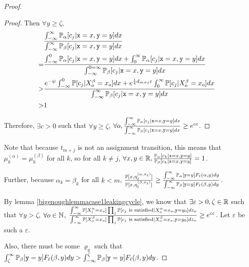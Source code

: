 \begin{proof}
\begin{proof}
	Then $\forall y\geq \zeta$, \begin{align*}
		&\frac{\int_{-\infty}^\infty\mathbb{P}_\alpha[c_j|\texttt{x}=x, \texttt{y}=y]dx}{\int_{-\infty}^\infty \mathbb{P}_\beta[c_j|\texttt{x}=x, \texttt{y}=y]dx} \\
		=&\frac{\int_{-\infty}^{0}\mathbb{P}_\alpha[c_j|\texttt{x}=x, \texttt{y}=y]dx+\int_{0}^{\infty}\mathbb{P}_\alpha[c_j|\texttt{x}=x, \texttt{y}=y]dx}{\int_{-\infty}^{0=\infty}\mathbb{P}_\beta[c_j|\texttt{x}=x, \texttt{y}=y]dx}\\
		>& \frac{e^{-\psi}\int_{-\infty}^{0}\mathbb{P}[c_j|X_o^\beta = x_o]dx+e^{\frac{1}{4}d_{m+j}\varepsilon}\int_{0}^{\infty}\mathbb{P}[c_j|X_o^\beta = x_o]dx}{\int_{-\infty}^{\infty}\mathbb{P}_\beta[c_j|\texttt{x}=x, \texttt{y}=y]dx}\\
		>&1
	\end{align*}

	Therefore, $\exists c>0$ such that $\forall y\geq \zeta$, $\forall o, \frac{\int_{-\infty}^\infty\mathbb{P}_\alpha[c_j|\texttt{x} = x, \texttt{y}=y]dx}{\int_{-\infty}^\infty\mathbb{P}_\beta[c_j|\texttt{x} = x, \texttt{y}=y]dx}\geq e^{c\varepsilon}$.
\end{proof}

	Note that because $t_{m+j}$ is not an assignment transition, this means that $\mu_k^{(\alpha)} = \mu_k^{(\beta)}$ for all $k$, so for all $k\neq j$, $\forall x, y\in \mathbb{R}, \frac{\mathbb{P}_\alpha[c_k|\texttt{x} = x, \texttt{y}=y]}{\mathbb{P}_\beta[c_k|\texttt{x} = x, \texttt{y}=y]}=1$.

	Further, because $\alpha_k = \beta_k$ for all $k<m$, $\frac{\mathbb{P}[x, \eta_\ell^{(\alpha, \sigma_\ell)}]}{\mathbb{P}[x, \eta_\ell^{(\beta, \sigma_\ell)}]}\geq \frac{\int_{-\infty}^\infty\mathbb{P}_\alpha[\texttt{y}=y] F_\ell(\alpha, y)dy}{\int_{-\infty}^\infty\mathbb{P}_\beta[\texttt{y}=y] F_\ell(\beta, y)dy}$.

	By lemma \ref{bigenoughlemmacase1leakingcycle}, we know that $\exists \varepsilon>0, \zeta\in \mathbb{R}$ such that $\forall y>\zeta$, $\forall o\in \mathbb{N}$, $\frac{\int_{-\infty}^\infty\mathbb{P}[X_i^\alpha=x_o]\prod_j \mathbb{P}[c_j\text{ is satisfied}|X_o^\alpha = x_o, \texttt{y}=y_0]dz_o}{\int_{-\infty}^\infty\mathbb{P}[X_o^\beta=x_o]\prod_j \mathbb{P}[c_j\text{ is satisfied}|X_o^\beta = x_o, \texttt{y}=y_0]dz_o}\geq e^{c\varepsilon}$. Let $\varepsilon$ be such a $\varepsilon$. 

	Also, there must be some $\varrho_y$ such that $\int_{\zeta}^\infty\mathbb{P}_\beta[\texttt{y}=y] F_\ell(\beta, y)dy>\int_{-\infty}^\zeta\mathbb{P}_\beta[\texttt{y}=y] F_\ell(\beta, y)dy$. 


\end{proof}
